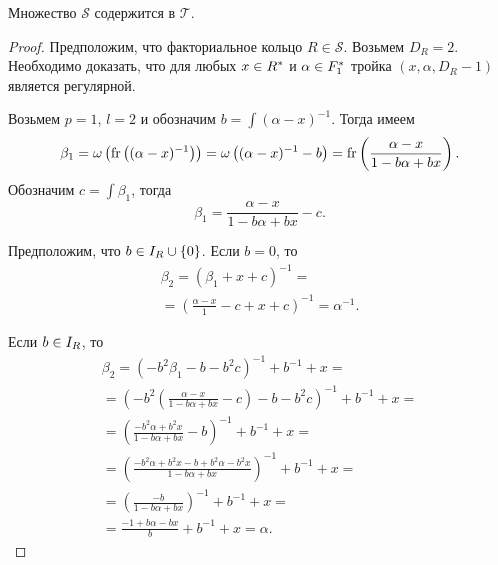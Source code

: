 \documentclass[_00_dissertation.tex]{subfiles}
\begin{document}
\begin{lemma}
    Множество $\mathcal{S}$ содержится в $\mathcal{T}$.
\end{lemma}
\begin{proof}
    Предположим, что факториальное кольцо $R \in \mathcal{S}$.
    Возьмем $D_R = 2$.
    Необходимо доказать, что для любых $x \in R^{*}$ и $\alpha \in F_1^{*}$ тройка $(x, \alpha, D_R - 1)$ является регулярной.
    
    Возьмем $p = 1$, $l = 2$ и обозначим $b = \int{(\alpha - x)^{-1}}$.
    Тогда имеем
    \begin{equation*}
        \beta_1 = \omega\left(
            \textrm{fr}\left((\alpha - x)^{-1}\right)
        \right) = \omega\left(
            (\alpha - x)^{-1} - b
        \right) = \textrm{fr}\left(\frac{\alpha - x}{1 - b\alpha + bx}\right).
    \end{equation*}
    Обозначим $c = \int{\beta_1}$, тогда
    \begin{equation*}
        \beta_1 = \frac{\alpha - x}{1 - b\alpha + bx} - c.
    \end{equation*}
    
    Предположим, что $b \in I_{R} \cup \{0\}$.
    Если $b = 0$, то
    \begin{equation*}
        \begin{split}
            \beta_2 = \left(
                \beta_1 + x + c
            \right)^{-1} = \\
            = \left(
                \frac{\alpha - x}{1} - c + x + c
            \right)^{-1} = \alpha^{-1}.
        \end{split}
    \end{equation*}

    Если $b \in I_{R}$, то
    \begin{equation*}
        \begin{split}
            \beta_2 = \left(
                -b^2 \beta_1 - b - b^2 c
            \right)^{-1} + b^{-1} + x = \\
            = \left(
                -b^2 \left(
                    \frac{\alpha - x}{1 - b\alpha + bx} - c
                \right) - b - b^2 c
            \right)^{-1} + b^{-1} + x = \\
            = \left(
                \frac{-b^2\alpha + b^2x}{1 - b\alpha + bx} - b
            \right)^{-1} + b^{-1} + x = \\
            = \left(
                \frac{-b^2\alpha + b^2x - b + b^2\alpha - b^2x}{1 - b\alpha + bx}
            \right)^{-1} + b^{-1} + x = \\
            = \left(
                \frac{- b}{1 - b\alpha + bx}
            \right)^{-1} + b^{-1} + x = \\
            = \frac{-1 + b\alpha - bx}{b} + b^{-1} + x = \alpha.
        \end{split}
    \end{equation*}
    

\end{proof}
\end{document}
